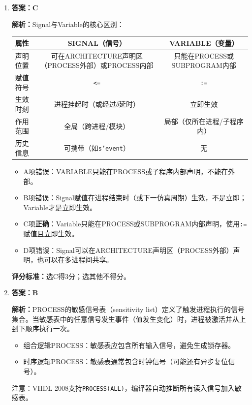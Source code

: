 \begin{enumerate}[label=\arabic*., leftmargin=*]
\noindent\textbf{评分标准：}选B得3分；选其他不得分。


\item \textbf{答案：C}

\noindent\textbf{解析：}Signal与Variable的核心区别：

\begin{table}[h]
\centering
\begin{tabular}{|l|c|c|}
\hline
\textbf{属性} & \textbf{SIGNAL（信号）} & \textbf{VARIABLE（变量）} \\
\hline
声明位置 & 可在ARCHITECTURE声明区（PROCESS外部）或PROCESS内部 & 只能在PROCESS或SUBPROGRAM内部 \\
\hline
赋值符号 & \texttt{<=} & \texttt{:=} \\
\hline
生效时刻 & 进程挂起时（或经过$\delta$延时） & 立即生效 \\
\hline
作用范围 & 全局（跨进程/模块） & 局部（仅所在进程/子程序内） \\
\hline
历史信息 & 可携带（如\texttt{s'event}） & 无 \\
\hline
\end{tabular}
\end{table}

\begin{itemize}
  \item A项错误：VARIABLE只能在PROCESS或子程序内部声明，不能在外部。
  \item B项错误：Signal赋值在进程结束时（或下一仿真周期）生效，不是立即；Variable才是立即生效。
  \item C项\textbf{正确}：Variable只能在PROCESS或SUBPROGRAM内部声明，使用\texttt{:=}赋值且立即生效。
  \item D项错误：Signal可以在ARCHITECTURE声明区（PROCESS外部）声明，也可以在多进程间共享。
\end{itemize}

\noindent\textbf{评分标准：}选C得3分；选其他不得分。


\item \textbf{答案：B}

\noindent\textbf{解析：}PROCESS的敏感信号表（sensitivity list）定义了触发进程执行的信号集合。当敏感表中的任意信号发生事件（值发生变化）时，进程被激活并从上到下顺序执行一次。
\begin{itemize}
  \item 组合逻辑PROCESS：敏感表应包含所有输入信号，避免生成锁存器。
  \item 时序逻辑PROCESS：敏感表通常包含时钟信号（可能还有异步复位信号）。
\end{itemize}
注意：VHDL-2008支持\texttt{PROCESS(ALL)}，编译器自动推断所有读入信号加入敏感表。


\end{enumerate}
